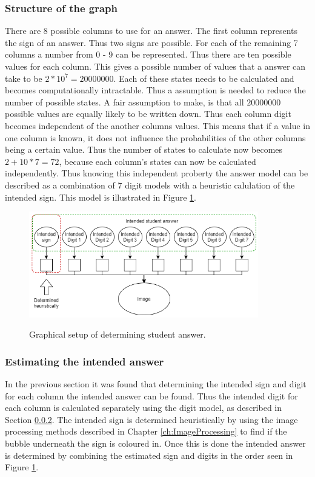 \subsubsection{Structure of the graph}

There are 8 possible columns to use for an answer. The first column represents the sign of an answer. Thus two signs are possible. For each of the remaining 7 columns a number from 0 - 9 can be represented. Thus there are ten possible values for each column. This gives a possible number of values that a answer can take to be $2*10^7 = 20 000 000$. Each of these states needs to be calculated and becomes computationally intractable. Thus a assumption is needed to reduce the number of possible states. A fair assumption to make, is that all $20 000 000$ possible values are equally likely to be written down. Thus each column digit becomes independent of the another columns values. This means that if a value in one column is known, it does not influence the probabilities of the other columns being a certain value. Thus the number of states to calculate now becomes $2+10*7=72$, because each column's states can now be calculated independently. Thus knowing this independent proberty the answer model can be described as a combination of 7 digit models with a heuristic calulation of the intended sign. This model is illustrated in Figure \ref{fig:stdAns}.

\begin{figure}
  \centering
  \includegraphics[width=10cm]{ans}\\
  \caption{Graphical setup of determining student answer.}
  \label{fig:stdAns}
\end{figure}


\subsubsection{Estimating the intended answer}
\label{sec:intendedDigit}

In the previous section it was found that determining the intended sign and digit for each column the intended answer can be found. Thus the intended digit for each column is calculated separately using the digit model, as described in Section \ref{sec:intendedDigit}. The intended sign is determined heuristically by using the image processing methods described in Chapter \ref{ch:ImageProcessing} to find if the bubble underneath the sign is coloured in. Once this is done the intended answer is determined by combining the estimated sign and digits in the order seen in Figure \ref{fig:stdAns}.

